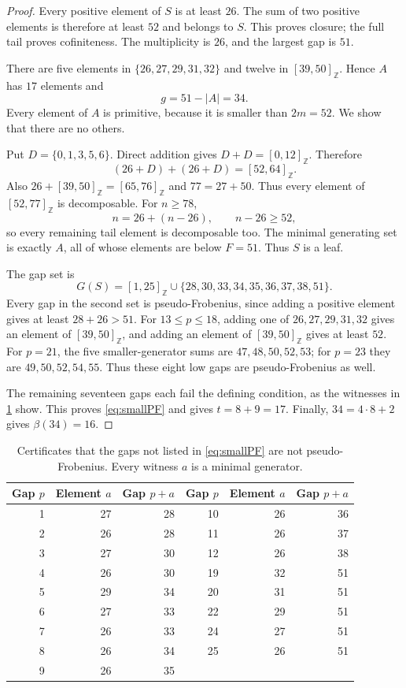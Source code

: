 \documentclass[11pt,letterpaper]{article}
\numberwithin{equation}{section}
\theoremstyle{definition}
\theoremstyle{remark}
\newcommand{\Z}{\mathbb Z}
\newcommand{\ints}[2]{[#1,#2]_{\Z}}
\newcommand{\conjb}{\beta}
\begin{document}
\begin{proof}
Every positive element of $S$ is at least $26$. The sum of two positive
elements is therefore at least $52$ and belongs to $S$. This proves closure;
the full tail proves cofiniteness. The multiplicity is $26$, and the largest
gap is $51$.

There are five elements in $\{26,27,29,31,32\}$ and twelve in
$\ints{39}{50}$. Hence $A$ has $17$ elements and
\[
 g=51-|A|=34.
\]
Every element of $A$ is primitive, because it is smaller than $2m=52$.
We show that there are no others.

Put $D=\{0,1,3,5,6\}$. Direct addition gives
$D+D=\ints{0}{12}$. Therefore
\[
 (26+D)+(26+D)=\ints{52}{64}.
\]
Also $26+\ints{39}{50}=\ints{65}{76}$ and $77=27+50$.
Thus every element of $\ints{52}{77}$ is decomposable. For $n\ge78$,
\[
 n=26+(n-26),\qquad n-26\ge52,
\]
so every remaining tail element is decomposable too. The minimal generating
set is exactly $A$, all of whose elements are below $F=51$. Thus $S$ is a leaf.

The gap set is
\begin{equation}\label{eq:smallgaps}
 G(S)=\ints{1}{25}\cup\{28,30,33,34,35,36,37,38,51\}.
\end{equation}
Every gap in the second set is pseudo-Frobenius, since adding a positive
element gives at least $28+26>51$. For $13\le p\le18$, adding one of
$26,27,29,31,32$ gives an element of $\ints{39}{50}$, and adding an element
of $\ints{39}{50}$ gives at least $52$. For $p=21$, the five smaller-generator
sums are $47,48,50,52,53$; for $p=23$ they are $49,50,52,54,55$.
Thus these eight low gaps are pseudo-Frobenius as well.

The remaining seventeen gaps each fail the defining condition, as the
witnesses in \cref{tab:witness} show. This proves \eqref{eq:smallPF} and gives
$t=8+9=17$. Finally, $34=4\cdot8+2$ gives $\conjb(34)=16$.
\end{proof}

\begin{table}[htbp]
\centering
\begin{tabular}{rrr@{\qquad}rrr}
\toprule
Gap $p$ & Element $a$ & Gap $p+a$ & Gap $p$ & Element $a$ & Gap $p+a$\\
\midrule
1&27&28 &10&26&36\\
2&26&28 &11&26&37\\
3&27&30 &12&26&38\\
4&26&30 &19&32&51\\
5&29&34 &20&31&51\\
6&27&33 &22&29&51\\
7&26&33 &24&27&51\\
8&26&34 &25&26&51\\
9&26&35 & & & \\
\bottomrule
\end{tabular}
\caption{Certificates that the gaps not listed in \eqref{eq:smallPF} are not
pseudo-Frobenius. Every witness $a$ is a minimal generator.}\label{tab:witness}
\end{table}
\end{document}
